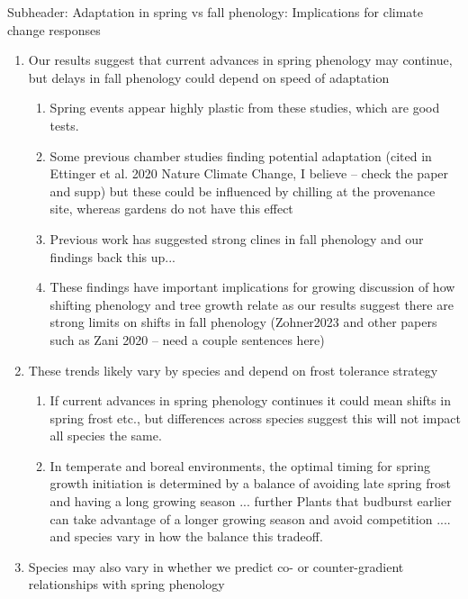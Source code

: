 \documentclass{article}
\begin{document}
Subheader: Adaptation in spring vs fall phenology: Implications for climate change responses
\begin{enumerate}
\item Our results suggest that current advances in spring phenology may continue, but delays in fall phenology could depend on speed of adaptation
\begin{enumerate}
\item Spring events appear highly plastic from these studies, which are good tests. 
\item Some previous chamber studies finding potential adaptation (cited in Ettinger et al. 2020 Nature Climate Change, I believe -- check the paper and supp) but these could be influenced by chilling at the provenance site, whereas gardens do not have this effect
\item Previous work has suggested strong clines in fall phenology and our findings back this up... 
\item These findings have important implications for growing discussion of how shifting phenology and tree growth relate as our results suggest there are strong limits on shifts in fall phenology (Zohner2023 and other papers such as Zani 2020 -- need a couple sentences here) %
\end{enumerate}
\item These trends likely vary by species and depend on frost tolerance strategy
\begin{enumerate}
\item If current advances in spring phenology continues it could mean shifts in spring frost etc., but differences across species suggest this will not impact all species the same. 
\item In temperate and boreal environments, the optimal timing for spring growth initiation is determined by a balance of avoiding late spring frost and having a long growing season \citep{alberto11, lenz16, allevato19} ... further Plants that budburst earlier can take advantage of a longer growing season and avoid competition  \citep{guo22}....  and species vary in how the balance this tradeoff. 
\end{enumerate}
\item Species may also vary in whether we predict co- or counter-gradient relationships with spring phenology
\begin{enumerate}

\end{enumerate}
\end{enumerate}
\end{document}
